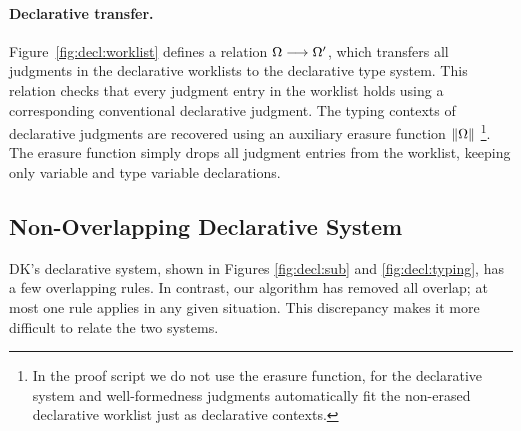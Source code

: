 \paragraph{Declarative transfer.}
Figure~\ref{fig:decl:worklist} defines a relation $\Omega \longrightarrow \Omega'$,
which transfers all judgments in the declarative worklists to the
declarative type system. This relation checks that every judgment entry in the worklist
holds using a corresponding conventional declarative judgment. 
The typing contexts of declarative judgments are recovered using an
auxiliary erasure function $\|\Omega\|$
\footnote{In the proof script we do not use the erasure function,
for the declarative system and well-formedness judgments automatically fit
the non-erased declarative worklist just as declarative contexts.}.
The erasure function simply drops all judgment entries from the worklist,
keeping only variable and type variable declarations.

\subsection{Non-Overlapping Declarative System}
\label{sec:metatheory:non-overlapping}

DK's declarative system, shown in Figures \ref{fig:decl:sub} and
\ref{fig:decl:typing}, has a few overlapping rules. In contrast, our algorithm
has removed all overlap; at most one rule applies in any given situation.
This discrepancy makes it more difficult to relate the two systems.

